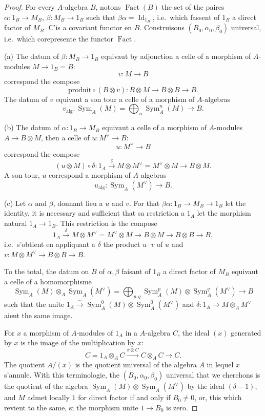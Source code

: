 \documentclass[11pt,a4paper]{article}
\theoremstyle{plain}
\theoremstyle{definition}
\DeclareMathOperator{\Sym}{Sym}
\DeclareMathOperator{\Id}{Id}
\DeclareMathOperator{\Fact}{Fact}
\newcommand{\alg}{\mathrm{alg}}
\begin{document}
\begin{proof}
For every $A$-algebra $B$, notons $\Fact(B)$ the set of the paires $\alpha:1_B\to M_B$, $\beta:M_B\to1_B$ such that $\beta\alpha=\Id_{1_B}$, i.e.~which fassent of $1_B$ a direct factor of $M_B$. C'is a covariant functor en $B$. Construisons $(B_0,\alpha_0,\beta_0)$ universal, i.e.~which corepresente the functor $\Fact$.

(a) The datum of $\beta:M_B\to1_B$ equivaut by adjonction a celle of a morphism of $A$-modules $M\to1_B=B$:
\[
v:M\to B
\]
correspond the compose
\[
\text{produit}\circ(B\otimes v):B\otimes M\to B\otimes B\to B.
\]
The datum of $v$ equivaut a son tour a celle of a morphism of $A$-algebras
\[
v_{\alg}:\Sym_A(M)=\bigoplus_n\Sym^n_A(M)\to B.
\]

(b) The datum of $\alpha:1_B\to M_B$ equivaut a celle of a morphism of $A$-modules $A\to B\otimes M$, then a celle of $u:M^\vee\to B$:
\[
u:M^\vee\to B
\]
correspond the compose
\[
(u\otimes M)\circ\delta:1_A\xrightarrow{\delta}M\otimes M^\vee=M^\vee\otimes M\to B\otimes M.
\]
A son tour, $u$ correspond a morphism of $A$-algebras
\[
u_{\alg}:\Sym_A(M^\vee)\to B.
\]

(c) Let $\alpha$ and $\beta$, donnant lieu a $u$ and $v$. For that $\beta\alpha:1_B\to M_B\to1_B$ let the identity, it is necessary and sufficient that sa restriction a $1_A$ let the morphism natural $1_A\to1_B$. This restriction is the compose
\[
1_A\xrightarrow{\delta}M\otimes M^\vee=M^\vee\otimes M\to B\otimes M\to B\otimes B\to B,
\]
i.e.~s'obtient en appliquant a $\delta$ the product $u\cdot v$ of $u$ and $v:M\otimes M^\vee\to B\otimes B\to B$.

To the total, the datum on $B$ of $\alpha,\beta$ faisant of $1_B$ a direct factor of $M_B$ equivaut a celle of a homomorphisme
\[
\Sym_A(M)\otimes_A\Sym_A(M^\vee)=\bigoplus_{p,q}\Sym^p_A(M)\otimes\Sym^q_A(M^\vee)\to B
\]
such that the unite $1_A\xrightarrow{\sim}\Sym^0_A(M)\otimes\Sym^0_A(M^\vee)$ and $\delta:1_A\to M\otimes_A M^\vee$ aient the same image.

For $x$ a morphism of $A$-modules of $1_A$ in a $A$-algebra $C$, the ideal $(x)$ generated by $x$ is the image of the multiplication by $x$:
\[
C=1_A\otimes_A C\xrightarrow{x\otimes C} C\otimes_A C\to C.
\]
The quotient $A/(x)$ is the quotient universal of the algebra $A$ in lequel $x$ s'annule. With this terminologie, the $(B_0,\alpha_0,\beta_0)$ universal that we cherchons is the quotient of the algebra $\Sym_A(M)\otimes\Sym_A(M^\vee)$ by the ideal $(\delta-1)$, and $M$ admet locally $1$ for direct factor if and only if $B_0\neq0$, or, this which revient to the same, si the morphism unite $1\to B_0$ is zero.


\end{proof}
\end{document}
